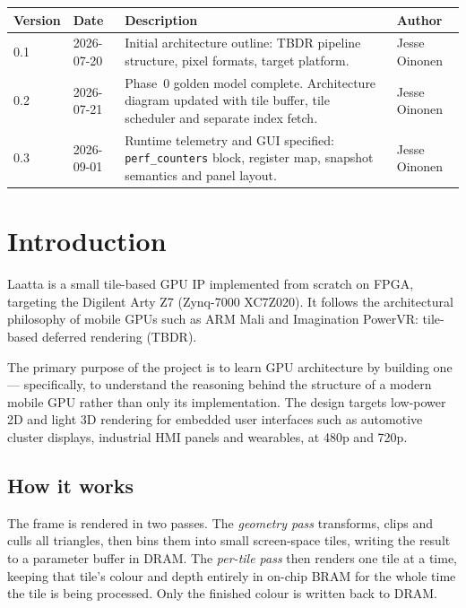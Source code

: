 \documentclass[11pt,a4paper]{article}
\newcommand{\docAuthor}{Jesse Oinonen}
\begin{document}
\begin{tabularx}{\textwidth}{@{}llXl@{}}
\toprule
\textbf{Version} & \textbf{Date} & \textbf{Description} & \textbf{Author} \\
\midrule
0.1 & 2026-07-20 & Initial architecture outline: TBDR pipeline structure,
                   pixel formats, target platform. & \docAuthor \\
0.2 & 2026-07-21 & Phase~0 golden model complete. Architecture diagram updated
                   with tile buffer, tile scheduler and separate index fetch. &
                   \docAuthor \\
0.3 & 2026-09-01 & Runtime telemetry and GUI specified: \texttt{perf\_counters}
                   block, register map, snapshot semantics and panel layout. & 
                   \docAuthor \\
\bottomrule
\end{tabularx}

\newpage
\tableofcontents
\newpage
\listoffigures
\newpage

\section{Introduction}
\label{sec:intro}

Laatta is a small tile-based GPU IP implemented from scratch on FPGA, targeting
the Digilent Arty Z7 (Zynq-7000 XC7Z020). It follows the architectural
philosophy of mobile GPUs such as ARM Mali and Imagination PowerVR: tile-based
deferred rendering (TBDR).

The primary purpose of the project is to learn GPU architecture by building one
--- specifically, to understand the reasoning behind the structure of a modern
mobile GPU rather than only its implementation. The design targets low-power 2D
and light 3D rendering for embedded user interfaces such as automotive cluster
displays, industrial HMI panels and wearables, at 480p and 720p.

\subsection{How it works}

The frame is rendered in two passes. The \emph{geometry pass} transforms, clips
and culls all triangles, then bins them into small screen-space tiles, writing
the result to a parameter buffer in DRAM. The \emph{per-tile pass} then renders
one tile at a time, keeping that tile's colour and depth entirely in on-chip
BRAM for the whole time the tile is being processed. Only the finished colour is
written back to DRAM.
\end{document}
